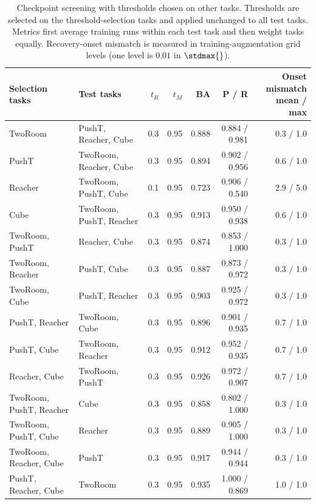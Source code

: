 \begin{table}[t]
\centering
\caption{Checkpoint screening with thresholds chosen on other tasks. Thresholds are selected on the threshold-selection tasks and applied unchanged to all test tasks. Metrics first average training runs within each test task and then weight tasks equally. Recovery-onset mismatch is measured in training-augmentation grid levels (one level is $0.01$ in $\stdmax{}$).}
\label{tab:cross-task-all-subsets}
\small
\setlength{\tabcolsep}{3.5pt}
\begin{tabular}{>{\raggedright\arraybackslash}p{}>{\raggedright\arraybackslash}p{}rrrrr}
\toprule
Selection tasks & Test tasks & $t_R$ & $t_M$ & BA & P / R & \shortstack{Onset mismatch\\mean / max} \\
\midrule
TwoRoom & PushT, Reacher, Cube & 0.3 & 0.95 & 0.888 & 0.884 / 0.981 & 0.3 / 1.0 \\
PushT & TwoRoom, Reacher, Cube & 0.3 & 0.95 & 0.894 & 0.902 / 0.956 & 0.6 / 1.0 \\
Reacher & TwoRoom, PushT, Cube & 0.1 & 0.95 & 0.723 & 0.906 / 0.540 & 2.9 / 5.0 \\
Cube & TwoRoom, PushT, Reacher & 0.3 & 0.95 & 0.913 & 0.950 / 0.938 & 0.6 / 1.0 \\
TwoRoom, PushT & Reacher, Cube & 0.3 & 0.95 & 0.874 & 0.853 / 1.000 & 0.3 / 1.0 \\
TwoRoom, Reacher & PushT, Cube & 0.3 & 0.95 & 0.887 & 0.873 / 0.972 & 0.3 / 1.0 \\
TwoRoom, Cube & PushT, Reacher & 0.3 & 0.95 & 0.903 & 0.925 / 0.972 & 0.3 / 1.0 \\
PushT, Reacher & TwoRoom, Cube & 0.3 & 0.95 & 0.896 & 0.901 / 0.935 & 0.7 / 1.0 \\
PushT, Cube & TwoRoom, Reacher & 0.3 & 0.95 & 0.912 & 0.952 / 0.935 & 0.7 / 1.0 \\
Reacher, Cube & TwoRoom, PushT & 0.3 & 0.95 & 0.926 & 0.972 / 0.907 & 0.7 / 1.0 \\
TwoRoom, PushT, Reacher & Cube & 0.3 & 0.95 & 0.858 & 0.802 / 1.000 & 0.3 / 1.0 \\
TwoRoom, PushT, Cube & Reacher & 0.3 & 0.95 & 0.889 & 0.905 / 1.000 & 0.3 / 1.0 \\
TwoRoom, Reacher, Cube & PushT & 0.3 & 0.95 & 0.917 & 0.944 / 0.944 & 0.3 / 1.0 \\
PushT, Reacher, Cube & TwoRoom & 0.3 & 0.95 & 0.935 & 1.000 / 0.869 & 1.0 / 1.0 \\
\bottomrule
\end{tabular}
\end{table}
